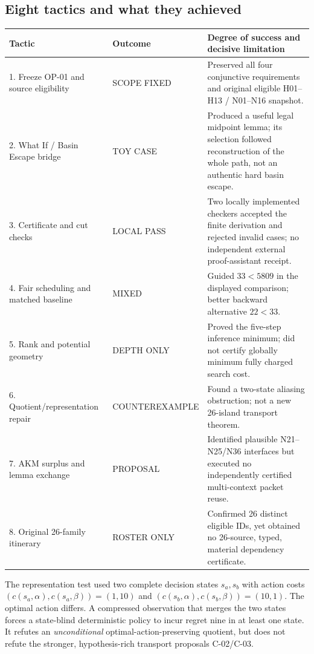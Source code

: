 \documentclass[11pt,letterpaper,oneside]{article}
\newcommand{\status}[1]{\textsf{\footnotesize #1}}
\begin{document}
\subsection{Eight tactics and what they achieved}
\begin{center}
\footnotesize
\begin{tabularx}{\textwidth}{@{}p{}p{}X@{}}
\toprule
Tactic & Outcome & Degree of success and decisive limitation\\\midrule
1. Freeze OP-01 and source eligibility & \status{SCOPE FIXED} & Preserved all four conjunctive requirements and original eligible H01--H13 / N01--N16 snapshot.\\
2. What If / Basin Escape bridge & \status{TOY CASE} & Produced a useful legal midpoint lemma; its selection followed reconstruction of the whole path, not an authentic hard basin escape.\\
3. Certificate and cut checks & \status{LOCAL PASS} & Two locally implemented checkers accepted the finite derivation and rejected invalid cases; no independent external proof-assistant receipt.\\
4. Fair scheduling and matched baseline & \status{MIXED} & Guided $33<5809$ in the displayed comparison; better backward alternative $22<33$.\\
5. Rank and potential geometry & \status{DEPTH ONLY} & Proved the five-step inference minimum; did not certify globally minimum fully charged search cost.\\
6. Quotient/representation repair & \status{COUNTEREXAMPLE} & Found a two-state aliasing obstruction; not a new 26-island transport theorem.\\
7. AKM surplus and lemma exchange & \status{PROPOSAL} & Identified plausible N21--N25/N36 interfaces but executed no independently certified multi-context packet reuse.\\
8. Original 26-family itinerary & \status{ROSTER ONLY} & Confirmed 26 distinct eligible IDs, yet obtained no 26-source, typed, material dependency certificate.\\\bottomrule
\end{tabularx}
\end{center}

The representation test used two complete decision states $s_a,s_b$ with action costs $(c(s_a,\alpha),c(s_a,\beta))=(1,10)$ and $(c(s_b,\alpha),c(s_b,\beta))=(10,1)$. The optimal action differs. A compressed observation that merges the two states forces a state-blind deterministic policy to incur regret nine in at least one state. It refutes an \emph{unconditional} optimal-action-preserving quotient, but does not refute the stronger, hypothesis-rich transport proposals C-02/C-03.
\end{document}
